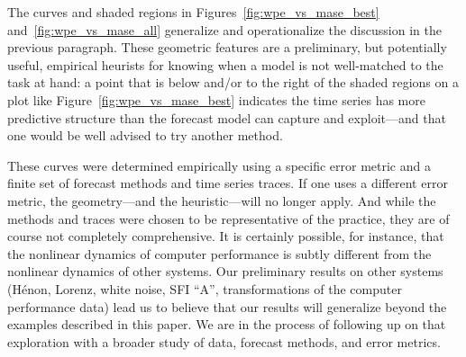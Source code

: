 The curves and shaded regions in Figures~\ref{fig:wpe_vs_mase_best}
and~\ref{fig:wpe_vs_mase_all} generalize and operationalize the
discussion in the previous paragraph.  These geometric features are a
preliminary, but potentially useful, empirical heurists for knowing
when a model is not well-matched to the task at hand: a point that is
below and/or to the right of the shaded regions on a plot like
Figure~\ref{fig:wpe_vs_mase_best} indicates the time series has more
predictive structure than the forecast model can capture and
exploit---and that one would be well advised to try another method.

These curves were determined empirically using a specific error metric
and a finite set of forecast methods and time series traces.  If one
uses a different error metric, the geometry---and the heuristic---will
no longer apply.  And while the methods and traces were chosen to be
representative of the practice, they are of course not completely
comprehensive.  It is certainly possible, for instance, that the
nonlinear dynamics of computer performance is subtly different from
the nonlinear dynamics of other systems.  Our preliminary results on
other systems (H\'enon, Lorenz, white noise, SFI ``A'', transformations
of the computer performance data) lead us to believe that our results
will generalize beyond the examples described in this paper.  We are
in the process of following up on that exploration with a broader
study of data, forecast methods, and error metrics.

% 


